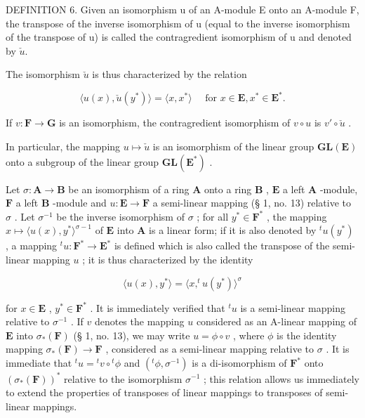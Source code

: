 DEFINITION 6. Given an isomorphism u of an A-module E onto an A-module F, the transpose of the inverse isomorphism of u (equal to the inverse isomorphism of the transpose of u) is called the contragredient isomorphism of u and denoted by \(\check{u}\).

The isomorphism \(\check{u}\) is thus characterized by the relation

\[
\langle u (x), \check {u} (y ^ {*}) \rangle = \langle x, x ^ {*} \rangle \quad \text { for } x \in \mathbf {E}, x ^ {*} \in \mathbf {E} ^ {*}.\tag{19}
\]

If \(v: \mathbf{F} \to \mathbf{G}\) is an isomorphism, the contragredient isomorphism of \(v \circ u\) is \(v' \circ \check{u}\) .

In particular, the mapping \(u \mapsto \check{u}\) is an isomorphism of the linear group \(\mathbf{GL}(\mathbf{E})\) onto a subgroup of the linear group \(\mathbf{GL}(\mathbf{E}^*)\) .

Let \(\sigma: \mathbf{A} \to \mathbf{B}\) be an isomorphism of a ring \(\mathbf{A}\) onto a ring \(\mathbf{B}\) , \(\mathbf{E}\) a left \(\mathbf{A}\) -module, \(\mathbf{F}\) a left \(\mathbf{B}\) -module and \(u: \mathbf{E} \to \mathbf{F}\) a semi-linear mapping (§ 1, no. 13) relative to \(\sigma\) . Let \(\sigma^{-1}\) be the inverse isomorphism of \(\sigma\) ; for all \(y^{*} \in \mathbf{F}^{*}\) , the mapping \(x \mapsto \langle u(x), y^{*} \rangle^{\sigma - 1}\) of \(\mathbf{E}\) into \(\mathbf{A}\) is a linear form; if it is also denoted by \(^t u(y^*)\) , a mapping \(^t u: \mathbf{F}^{*} \to \mathbf{E}^{*}\) is defined which is also called the transpose of the semi-linear mapping \(u\) ; it is thus characterized by the identity

\[
\langle u (x), y ^ {*} \rangle = \langle x, ^ {t} u (y ^ {*}) \rangle^ {\sigma}\tag{20}
\]

for \(x \in \mathbf{E}\) , \(y^* \in \mathbf{F}^*\) . It is immediately verified that \({}^t u\) is a semi-linear mapping relative to \(\sigma^{-1}\) . If \(v\) denotes the mapping \(u\) considered as an A-linear mapping of \(\mathbf{E}\) into \(\sigma_*(\mathbf{F})\) (§ 1, no. 13), we may write \(u = \phi \circ v\) , where \(\phi\) is the identity mapping \(\sigma_*(\mathbf{F}) \to \mathbf{F}\) , considered as a semi-linear mapping relative to \(\sigma\) . It is immediate that \({}^t u = {}^t v \circ {}^t \phi\) and \(({}^t \phi, \sigma^{-1})\) is a di-isomorphism of \(\mathbf{F}^*\) onto \((\sigma_*(\mathbf{F}))^*\) relative to the isomorphism \(\sigma^{-1}\) ; this relation allows us immediately to extend the properties of transposes of linear mappings to transposes of semi-linear mappings.

